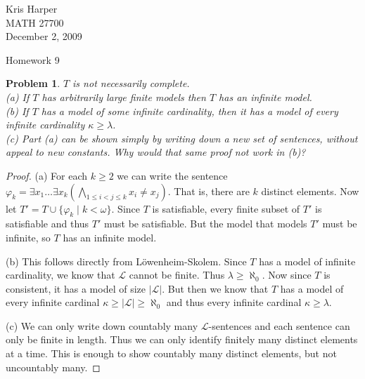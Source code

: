 \documentclass{article}
\newtheorem{problem}{Problem}
\begin{document}
\begin{flushright}
Kris Harper\\

MATH 27700\\

December 2, 2009
\end{flushright}

\begin{center}
Homework 9
\end{center}

\begin{problem}
$T$ is not necessarily complete.\\
(a) If $T$ has arbitrarily large finite models then $T$ has an infinite model.\\
(b) If $T$ has a model of some infinite cardinality, then it has a model of every infinite cardinality $\kappa \geq \lambda$.\\
(c) Part (a) can be shown simply by writing down a new set of sentences, without appeal to new constants. Why would that same proof not work in (b)?
\end{problem}
\begin{proof}
(a) For each $k \geq 2$ we can write the sentence $\varphi_k = \exists x_1 \dots \exists x_k \left (\bigwedge_{1 \leq i < j \leq k} x_i \neq x_j \right )$. That is, there are $k$ distinct elements. Now let $T' = T \cup \{\varphi_k \mid k < \omega\}$. Since $T$ is satisfiable, every finite subset of $T'$ is satisfiable and thus $T'$ must be satisfiable. But the model that models $T'$ must be infinite, so $T$ has an infinite model.

(b) This follows directly from L\"{o}wenheim-Skolem. Since $T$ has a model of infinite cardinality, we know that $\mathcal{L}$ cannot be finite. Thus $\lambda \geq \aleph_0$. Now since $T$ is consistent, it has a model of size $|\mathcal{L}|$. But then we know that $T$ has a model of every infinite cardinal $\kappa \geq |\mathcal{L}| \geq \aleph_0$ and thus every infinite cardinal $\kappa \geq \lambda$.

(c) We can only write down countably many $\mathcal{L}$-sentences and each sentence can only be finite in length. Thus we can only identify finitely many distinct elements at a time. This is enough to show countably many distinct elements, but not uncountably many.
\end{proof}
\end{document}
